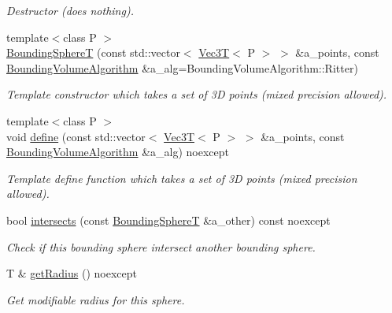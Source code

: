 \begin{DoxyCompactItemize}
\begin{DoxyCompactList}\small\item\em Destructor (does nothing). \end{DoxyCompactList}\item 
{\footnotesize template$<$class P $>$ }\\\hyperlink{classBoundingVolumes_1_1BoundingSphereT_a88655edd39b6276b9bb58eb9bd6af82d}{Bounding\+SphereT} (const std\+::vector$<$ \hyperlink{classVec3T}{Vec3T}$<$ P $>$ $>$ \&a\+\_\+points, const \hyperlink{classBoundingVolumes_1_1BoundingSphereT_ae98cd00c8e45c93a0fc4fbabec63b007}{Bounding\+Volume\+Algorithm} \&a\+\_\+alg=Bounding\+Volume\+Algorithm\+::\+Ritter)
\begin{DoxyCompactList}\small\item\em Template constructor which takes a set of 3D points (mixed precision allowed). \end{DoxyCompactList}\item 
{\footnotesize template$<$class P $>$ }\\void \hyperlink{classBoundingVolumes_1_1BoundingSphereT_aac21650a7d3f65081483512064cbcfa8}{define} (const std\+::vector$<$ \hyperlink{classVec3T}{Vec3T}$<$ P $>$ $>$ \&a\+\_\+points, const \hyperlink{classBoundingVolumes_1_1BoundingSphereT_ae98cd00c8e45c93a0fc4fbabec63b007}{Bounding\+Volume\+Algorithm} \&a\+\_\+alg) noexcept
\begin{DoxyCompactList}\small\item\em Template define function which takes a set of 3D points (mixed precision allowed). \end{DoxyCompactList}\item 
bool \hyperlink{classBoundingVolumes_1_1BoundingSphereT_a90baad0c400aac7645a7e8c1ab13096a}{intersects} (const \hyperlink{classBoundingVolumes_1_1BoundingSphereT}{Bounding\+SphereT} \&a\+\_\+other) const noexcept
\begin{DoxyCompactList}\small\item\em Check if this bounding sphere intersect another bounding sphere. \end{DoxyCompactList}\item 
\mbox{\label{classBoundingVolumes_1_1BoundingSphereT_a8c4f10492e97aa460b1207f384e1c081}} 
T \& \hyperlink{classBoundingVolumes_1_1BoundingSphereT_a8c4f10492e97aa460b1207f384e1c081}{get\+Radius} () noexcept
\begin{DoxyCompactList}\small\item\em Get modifiable radius for this sphere. \end{DoxyCompactList}\item 

\end{DoxyCompactItemize}
